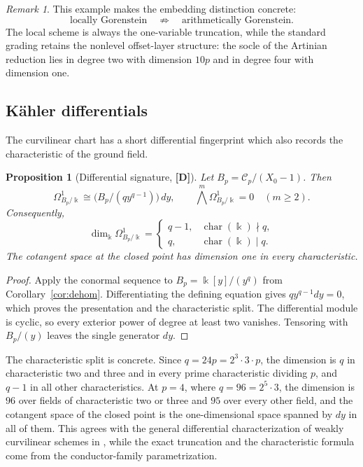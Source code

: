 \documentclass[11pt]{article}
\newtheorem{proposition}[theorem]{Proposition}
\theoremstyle{definition}
\theoremstyle{remark}
\newtheorem{remark}[theorem]{Remark}
\newcommand{\kfield}{\Bbbk}
\newcommand{\Cfiber}{\mathcal{C}}
\newcommand{\mD}{\textbf{[D]}}
\begin{document}
\begin{remark}
This example makes the embedding distinction concrete:
\[
 \text{locally Gorenstein}\quad\not\Rightarrow\quad\text{arithmetically Gorenstein}.
\]
The local scheme is always the one-variable truncation, while the standard grading retains the
nonlevel offset-layer structure: the socle of the Artinian reduction lies in degree two with
dimension $10p$ and in degree four with dimension one.
\end{remark}

\subsection{K\"ahler differentials}

The curvilinear chart has a short differential fingerprint which also records the
characteristic of the ground field.

\begin{proposition}[Differential signature, \mD]\label{prop:differentials}
Let $B_p=\Cfiber_p/(X_0-1)$. Then
\[
 \Omega^1_{B_p/\kfield}
 \cong \bigl(B_p/(q y^{q-1})\bigr)\,dy,
 \qquad \bigwedge
 ^m\Omega^1_{B_p/\kfield}=0\quad(m\geq2).
\]
Consequently,
\[
 \dim_{\kfield}\Omega^1_{B_p/\kfield}=
 \begin{cases}
 q-1,&\operatorname{char}(\kfield)\nmid q,\\
 q,&\operatorname{char}(\kfield)\mid q.
 \end{cases}
\]
The cotangent space at the closed point has dimension one in every characteristic.
\end{proposition}

\begin{proof}
Apply the conormal sequence to $B_p=\kfield[y]/(y^q)$ from Corollary~\ref{cor:dehom}.
Differentiating the defining equation gives $q y^{q-1}dy=0$, which proves the presentation
and the characteristic split. The differential module is cyclic, so every exterior power of
degree at least two vanishes. Tensoring with $B_p/(y)$ leaves the single generator $dy$.
\end{proof}

The characteristic split is concrete. Since $q=24p=2^3\cdot3\cdot p$, the dimension is $q$ in
characteristic two and three and in every prime characteristic dividing $p$, and $q-1$ in all
other characteristics. At $p=4$, where $q=96=2^5\cdot3$, the dimension is $96$ over fields of characteristic two or three and $95$ over every other field, and the cotangent space of the closed point is the one-dimensional space spanned by $dy$ in all of them. This agrees with the general differential characterization of weakly
curvilinear schemes in \cite{KreuzerLinhLong2023}, while the exact truncation and the
characteristic formula come from the conductor-family parametrization.
\end{document}
